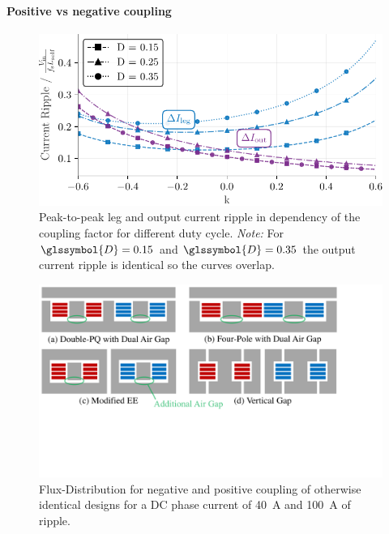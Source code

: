 \documentclass{IPEC2026}
\newcommand{\sbl}[1]{\glssymbol{#1}}
\begin{document}
\paragraph{Positive vs negative coupling}
\begin{figure}
    \centering
    \includegraphics[width=0.95\columnwidth]{figures/Python/current_ripple_plot.pdf}
    \caption{Peak-to-peak leg and output current ripple in dependency of the coupling factor for different duty cycle. \textit{Note:} For $\sbl{D}=0.15$ and $\sbl{D}=0.35$ the output current ripple is identical so the curves overlap.}
    \label{fig:OutputAndLegRipple}
\end{figure}
\begin{figure}
  \includegraphics[page=3, trim = 0cm 1cm 3.5cm 0cm, clip, width=\columnwidth]{figures/IPEC_Figures_PowerPoint.pdf}
  \caption{Flux-Distribution for negative and positive coupling of otherwise identical designs for a DC phase current of \qty{40}{\A} and \qty{100}{\A} of ripple.}
  \label{fig:Fluxposneg}
\end{figure}
\end{document}
